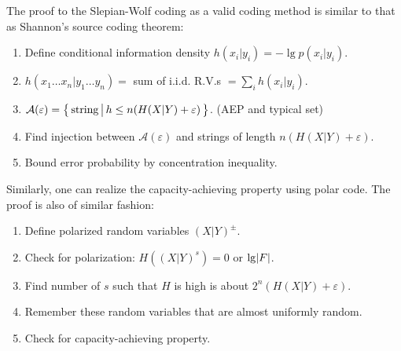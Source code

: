 The proof to the Slepian-Wolf coding as a valid coding method is similar to that as Shannon's source coding theorem:
\begin{enumerate}
    \item Define conditional information density $h(x_i\vert y_i) = -\lg p(x_i\vert y_i)$.
    \item $h(x_1\ldots x_n\vert y_1\ldots y_n) = $ sum of i.i.d. R.V.s $ = \sum_i h(x_i\vert y_i)$.
    \item $\mathcal{A}(\varepsilon) = \left\{\,{\text{string}}\,\middle\vert\,{h\le n(H(X\vert Y)+\varepsilon)}\,\right\}$. (AEP and typical set)
    \item Find injection between $\mathcal{A}(\varepsilon)$ and strings of length $n(H(X\vert Y)+\varepsilon)$.
    \item Bound error probability by concentration inequality.
\end{enumerate}

Similarly, one can realize the capacity-achieving property using polar code. The proof is also of similar fashion:
\begin{enumerate}
    \item Define polarized random variables $(X\vert Y)^\pm$.
    \item Check for polarization: $H((X\vert Y)^s)=0$ or $\lg\abs{F}$.
    \item Find number of $s$ such that $H$ is high is about $2^n(H(X\vert Y)+\varepsilon)$.
    \item Remember these random variables that are almost uniformly random.
    \item Check for capacity-achieving property.
\end{enumerate}

